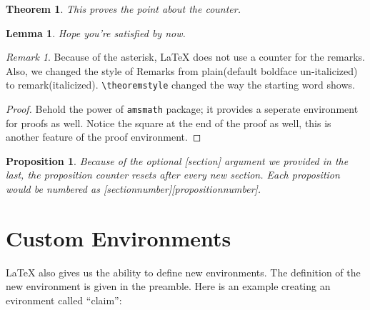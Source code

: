 \documentclass[12pt, letterpaper]{article}
\newcounter{claim} %
\newtheorem{theorem}{Theorem}
\newtheorem{lemma}{Lemma}
\newtheorem{proposition}{Proposition}[section]
\theoremstyle{remark}
\newtheorem*{remark}{Remark}
\begin{document}
    \begin{theorem}
        This proves the point about the counter.
    \end{theorem}

    \begin{lemma}
        Hope you're satisfied by now.
    \end{lemma}

    \begin{remark}
        Because of the asterisk, \LaTeX{} does not use a counter for the remarks. Also, we changed the
        style of Remarks from plain(default boldface un-italicized) to remark(italicized).
        \verb!\theoremstyle! changed the way the starting word shows.
    \end{remark}

    \begin{proof}
        Behold the power of \verb!amsmath! package; it provides a seperate environment for proofs as well. Notice
        the square at the end of the proof as well, this is another feature of the proof environment.\footnotemark[3]
    \end{proof}

    \begin{proposition}
        Because of the optional [section] argument we provided in the last, the proposition counter
        resets after every new section. Each proposition would be numbered as [sectionnumber][propositionnumber].
    \end{proposition}

\clearpage
\section{Custom Environments}

\LaTeX{} also gives us the ability to define new environments. The definition of the new environment
is given in the preamble. Here is an example creating an evironment called ``claim'':
\end{document}
